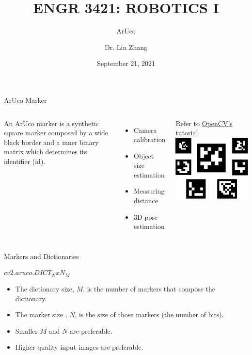 \documentclass[12pt,letterpaper]{beamer}
\title[Robotics I]
{ENGR 3421: ROBOTICS I}
\subtitle{ArUco}
\author[Zhang, Lin]
{Dr. Lin Zhang}
\institute[UCA] %
{
  Department of Physics and Astronomy\\
  University of Central Arkansas
}
\date[Robotics1 2021] %
{September 21, 2021}
\begin{document}
\frame{\titlepage}



\begin{frame}{ArUco Marker}
    \begin{columns}
        An ArUco marker is a synthetic square marker composed by a wide black border and a inner binary matrix which determines its identifier (id). 
        {\scriptsize
            \begin{itemize}
                \item Camera calibration
                \item Object size estimation
                \item Measuring distance
                \item 3D pose estimation
            \end{itemize}
        }
        Refer to \href{https://docs.opencv.org/4.5.2/d5/dae/tutorial_aruco_detection.html}{OpenCV's tutorial}.
        \includegraphics[width=0.8\linewidth]{aruco_markers}
    \end{columns}
\end{frame}


\begin{frame}{Markers and Dictionaries}

    $cv2.aruco.DICT_NxN_M$
    {\scriptsize
        \begin{itemize}
            \item The dictionary size, $M$, is the number of markers that compose the dictionary. 
            \item The marker size , $N$, is the size of those markers (the number of bits).
            \item Smaller $M$ and $N$ are preferable.
            \item Higher-quality input images are preferable.
        \end{itemize}
    }

\end{frame}
\end{document}
